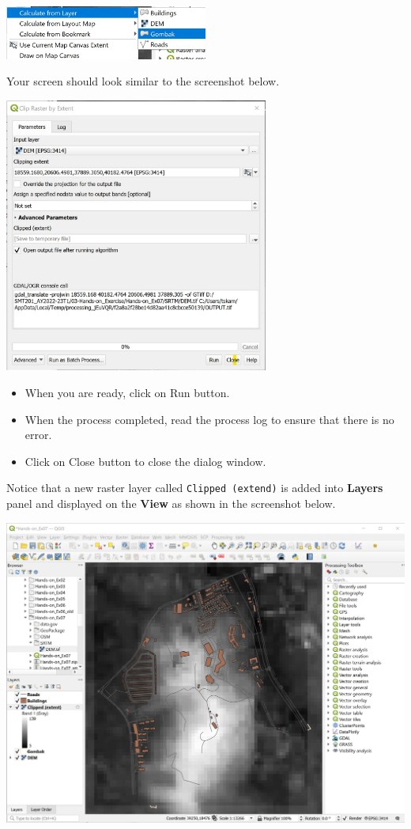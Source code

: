 \documentclass[
  letterpaper,
  DIV=11,
  numbers=noendperiod]{scrreprt}
\providecommand{\tightlist}{%
  \setlength{\itemsep}{0pt}\setlength{\parskip}{0pt}}\usepackage{longtable,booktabs,array}
\begin{document}
\includegraphics[width=0.5\textwidth,height=\textheight]{./img07/image20.jpg}

Your screen should look similar to the screenshot below.

\includegraphics[width=0.65\textwidth,height=\textheight]{./img07/image21.jpg}

\begin{itemize}
\tightlist
\item
  When you are ready, click on Run button.
\item
  When the process completed, read the process log to ensure that there
  is no error.
\item
  Click on Close button to close the dialog window.
\end{itemize}

Notice that a new raster layer called \texttt{Clipped\ (extend)} is
added into \textbf{Layers} panel and displayed on the \textbf{View} as
shown in the screenshot below.

\includegraphics{./img07/image22.jpg}
\end{document}
